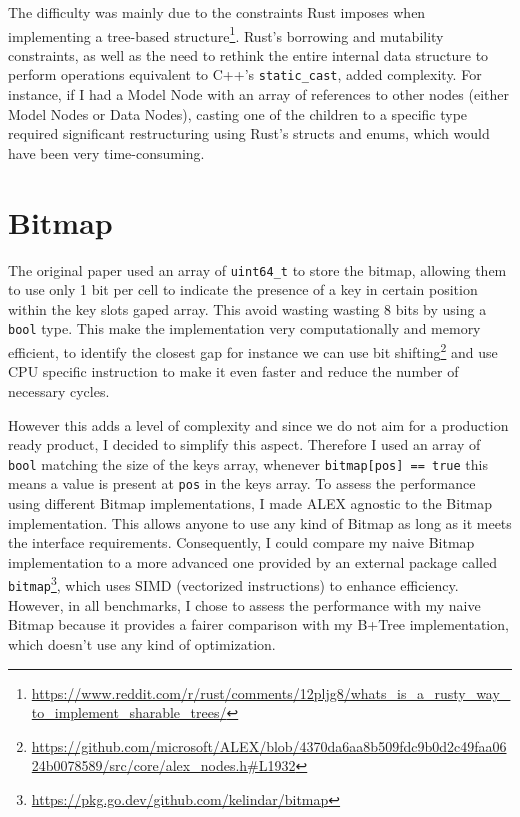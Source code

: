 The difficulty was mainly due to the constraints Rust imposes when implementing a tree-based structure\footnote{\url{https://www.reddit.com/r/rust/comments/12pljg8/whats_is_a_rusty_way_to_implement_sharable_trees/}}. Rust's borrowing and mutability constraints, as well as the need to rethink the entire internal data structure to perform operations equivalent to C++'s \texttt{static\_cast}, added complexity. For instance, if I had a Model Node with an array of references to other nodes (either Model Nodes or Data Nodes), casting one of the children to a specific type required significant restructuring using Rust's structs and enums, which would have been very time-consuming.

\section{Bitmap}
The original paper used an array of \texttt{uint64\_t} to store the bitmap, allowing them to use only 1 bit per cell to indicate the presence of a key in certain position within the key slots gaped array. This avoid wasting wasting 8 bits by using a \texttt{bool} type. This make the implementation very computationally and memory efficient, to identify the closest gap for instance we can use bit shifting\footnote{\url{https://github.com/microsoft/ALEX/blob/4370da6aa8b509fdc9b0d2c49faa0624b0078589/src/core/alex_nodes.h\#L1932}} and use CPU specific instruction to make it even faster and reduce the number of necessary cycles.

However this adds a level of complexity and since we do not aim for a production ready product, I decided to simplify this aspect. Therefore I used an array of \texttt{bool} matching the size of the keys array, whenever \texttt{bitmap[pos] == true} this means a value is present at \texttt{pos} in the keys array. To assess the performance using different Bitmap implementations, I made ALEX agnostic to the Bitmap implementation. This allows anyone to use any kind of Bitmap as long as it meets the interface requirements. Consequently, I could compare my naive Bitmap implementation to a more advanced one provided by an external package called \texttt{bitmap}\footnote{\url{https://pkg.go.dev/github.com/kelindar/bitmap}}, which uses SIMD (vectorized instructions) to enhance efficiency. However, in all benchmarks, I chose to assess the performance with my naive Bitmap because it provides a fairer comparison with my B+Tree implementation, which doesn't use any kind of optimization.

